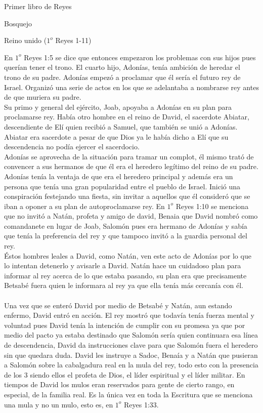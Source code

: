 \begin{section}{Primer libro de Reyes}
\begin{subsection}{Bosquejo}
\begin{subsubsection}{Reino unido ($1^{o}$ Reyes 1-11)}
\begin{enumerate}
					En $1^{o}$ Reyes 1:5 se dice que entonces empezaron los problemas con sus hijos pues querían tener el trono. El cuarto hijo, Adonías, tenía ambición de heredar el trono de su padre. Adonías empezó a proclamar que él sería el futuro rey de Israel. Organizó una serie de actos en los que se adelantaba a nombrarse rey antes de que muriera su padre.\\
					Su primo y general del ejército, Joab, apoyaba a Adonías en su plan para proclamarse rey. Había otro hombre en el reino de David, el sacerdote Abiatar, descendiente de Elí quien recibió a Samuel, que también se unió a Adonías. Abiatar era sacerdote a pesar de que Dios ya le había dicho a Elí que su descendencia no podía ejercer el sacerdocio.\\
					\newpage
					Adonías se aprovecha de la situación para tramar un complot, él mismo trató de convencer a sus hermanos de que él era el heredero legítimo del reino de su padre. \\
					Adonías tenía la ventaja de que era el heredero principal y además era un persona que tenía una gran popularidad entre el pueblo de Israel. Inició una conspiración festejando una fiesta, sin invitar a aquellos que él consideró que se iban a oponer a su plan de autoproclamarse rey. En $1^{o}$ Reyes 1:10 se menciona que no invitó a Natán, profeta y amigo de david, Benaia que David nombró como comandanete en lugar de Joab, Salomón pues era hermano de Adonías y sabía que tenía la preferencia del rey y que tampoco invitó a la guardia personal del rey.\\
					Éstos hombres leales a David, como Natán, ven este acto de Adonías por lo que lo intentan detenerlo y avisarle a David. Natán hace un cuidadoso plan para informar al rey acerca de lo que estaba pasando, su plan era que precisamente Betsabé fuera quien le informara al rey ya que ella tenía más cercanía con él.\\ \\
					Una vez que se enteró David por medio de Betsabé y Natán, aun estando enfermo, David entró en acción. El rey mostró que todavía tenía fuerza mental y voluntad pues David tenía la intención de cumplir con su promesa ya que por medio del pacto ya estaba destinado que Salomón sería quien continuara esa línea de descendencia, David da instrucciones clave para que Salomón fuera el heredero sin que quedara duda. David les instruye a Sadoc, Benaía y a Natán que pusieran a Salomón sobre la cabalgadura real en la mula del rey, todo esto con la presencia de los 3 siendo ellos el profeta de Dios, el líder espiritual y el líder militar. En tiempos de David los mulos eran reservados para gente de cierto rango, en especial, de la familia real. Es la única vez en toda la Escritura que se menciona una mula y no un mulo, esto es, en $1^{o}$ Reyes 1:33.\\

\end{enumerate}
\end{subsubsection}
\end{subsection}
\end{section}
